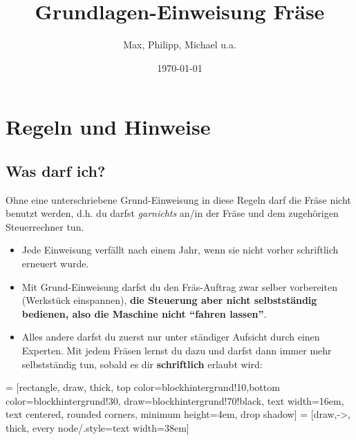 \documentclass{\basedir/fablab-document}
\date{\today}
\author{Max, Philipp, Michael u.a.}
\title{Grundlagen-Einweisung Fräse}
\begin{document}
\section{Regeln und Hinweise}\label{regeln}
\subsection{Was darf ich?}
Ohne eine unterschriebene Grund-Einweisung in diese Regeln darf die Fräse nicht benutzt werden, d.h. du darfst \emph{garnichts} an/in der Fräse und dem zugehörigen Steuerrechner tun.
\begin{itemize}
 \item Jede Einweisung verfällt nach einem Jahr, wenn sie nicht vorher schriftlich erneuert wurde. 
 \item Mit Grund-Einweisung darfst du den Fräs-Auftrag zwar selber vorbereiten (Werkstück einspannen), \textbf{die Steuerung aber nicht selbstständig bedienen, also die Maschine nicht \enquote{fahren lassen}}.
 \item Alles andere darfst du zuerst nur unter ständiger Aufsicht durch einen Experten. Mit jedem Fräsen lernst du dazu und darfst dann immer mehr selbstständig tun, sobald es dir \textbf{schriftlich} erlaubt wird:
\end{itemize}
 = [rectangle, draw, thick, top color=blockhintergrund!10,bottom color=blockhintergrund!30, draw=blockhintergrund!70!black,
    text width=16em, text centered, rounded corners, minimum height=4em, drop shadow]
 = [draw,->, thick, every node/.style={text width=38em}]
\vspace{1em}
\end{document}
